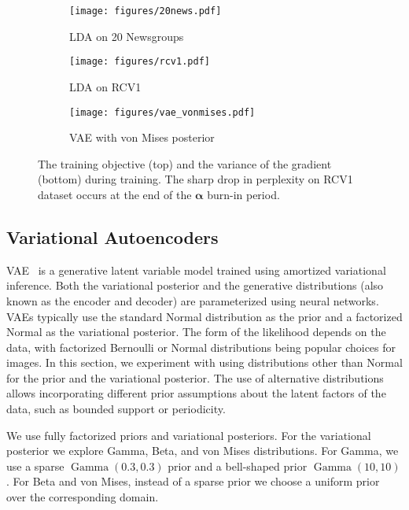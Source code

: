 \documentclass{article}
\let\vec\bm
\begin{document}
\begin{figure}
    \centering
    \begin{subfigure}[b]{0.32\linewidth}
        \texttt{[image: figures/20news.pdf]}
        \caption{LDA on 20 Newsgroups}
    \end{subfigure}
    \begin{subfigure}[b]{0.32\linewidth}
        \texttt{[image: figures/rcv1.pdf]}
        \caption{LDA on RCV1}
    \end{subfigure}
    \begin{subfigure}[b]{0.32\linewidth}
        \texttt{[image: figures/vae\_vonmises.pdf]}
        \caption{VAE with von Mises posterior}
        \label{fig:vonmises-vae-grad-variance}
    \end{subfigure}
    \caption{The training objective (top) and the variance of the gradient (bottom) during training. The sharp drop in perplexity on RCV1 dataset occurs at the end of the $\vec{\alpha}$ burn-in period.}
    \label{fig:grad-variance}
\end{figure}

\subsection{Variational Autoencoders}

VAE~\cite{kingma2014auto,rezende2014stochastic} is a generative latent variable model trained using amortized variational inference.
Both the variational posterior and the generative distributions (also known as the encoder and decoder) are parameterized using neural networks. VAEs typically use the standard Normal distribution as the prior and a factorized Normal as the variational posterior. The form of the likelihood depends on the data, with factorized Bernoulli or Normal distributions being popular choices for images. 
In this section, we experiment with using distributions other than Normal for the prior and the variational posterior.
The use of alternative distributions allows incorporating different prior assumptions about the latent factors of the data, such as bounded support or periodicity.

We use fully factorized priors and variational posteriors.
For the variational posterior we explore Gamma, Beta, and von Mises distributions.
For Gamma, we use a sparse $\operatorname{Gamma}(0.3, 0.3)$ prior and a bell-shaped prior $\operatorname{Gamma}(10, 10)$.
For Beta and von Mises, instead of a sparse prior we choose a uniform prior over the corresponding domain.
\end{document}
